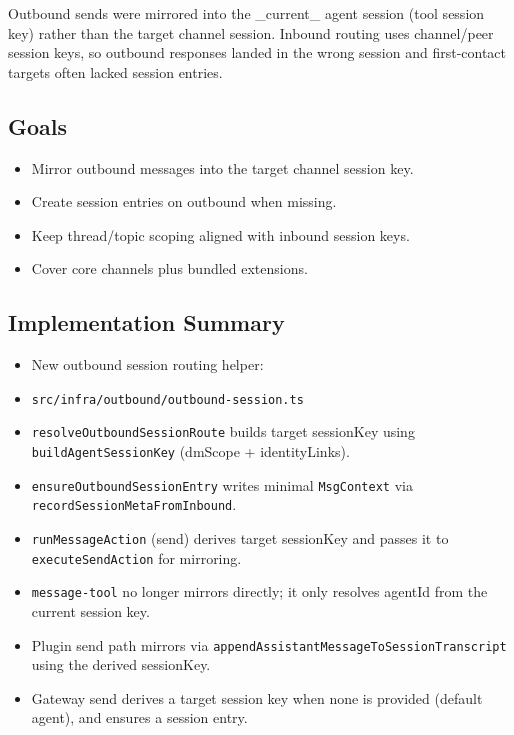 Outbound sends were mirrored into the \_current\_ agent session (tool session key) rather than the target channel session. Inbound routing uses channel/peer session keys, so outbound responses landed in the wrong session and first-contact targets often lacked session entries.

\subsection{Goals}


\begin{itemize}
  \item Mirror outbound messages into the target channel session key.
  \item Create session entries on outbound when missing.
  \item Keep thread/topic scoping aligned with inbound session keys.
  \item Cover core channels plus bundled extensions.
\end{itemize}


\subsection{Implementation Summary}


\begin{itemize}
  \item New outbound session routing helper:
  \item \texttt{src/infra/outbound/outbound-session.ts}
  \item \texttt{resolveOutboundSessionRoute} builds target sessionKey using \texttt{buildAgentSessionKey} (dmScope + identityLinks).
  \item \texttt{ensureOutboundSessionEntry} writes minimal \texttt{MsgContext} via \texttt{recordSessionMetaFromInbound}.
  \item \texttt{runMessageAction} (send) derives target sessionKey and passes it to \texttt{executeSendAction} for mirroring.
  \item \texttt{message-tool} no longer mirrors directly; it only resolves agentId from the current session key.
  \item Plugin send path mirrors via \texttt{appendAssistantMessageToSessionTranscript} using the derived sessionKey.
  \item Gateway send derives a target session key when none is provided (default agent), and ensures a session entry.
\end{itemize}


